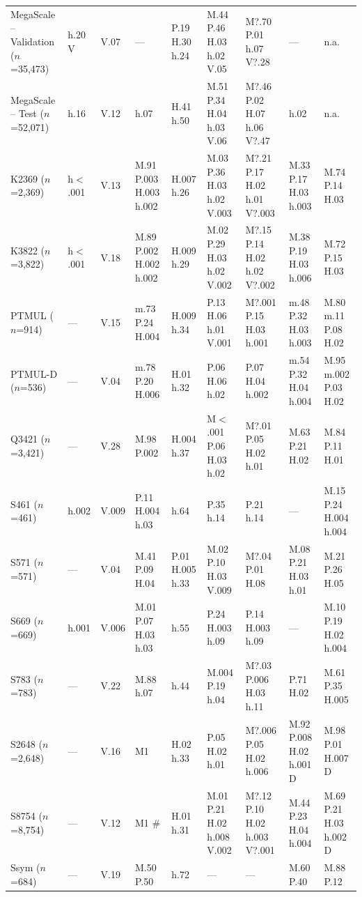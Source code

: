 \begin{table}[H]
{\begin{tabular}{@{}lllllllll}
        MegaScale -- Validation ($n$=35,473) & h.20 V & V.07 & --- & P.19 H.30 h.24 & M.44 P.46 H.03 h.02 V.05 & M?.70 P.01 h.07 V?.28 & --- & n.a. \\
        MegaScale -- Test ($n$=52,071) & h.16 & V.12 & h.07 & H.41 h.50 & M.51 P.34 H.04 h.03 V.06 & M?.46 P.02 H.07 h.06 V?.47 & h.02 & n.a. \\
        \midrule
        K2369 ($n$=2,369) & h$<$.001 & V.13 & M.91 P.003 H.003 h.002 & H.007 h.26 & M.03 P.36 H.03 h.02 V.003 & M?.21 P.17 H.02 h.01 V?.003 & M.33 P.17 H.03 h.003 & M.74 P.14 H.03 \\
        K3822 ($n$=3,822) & h$<$.001 & V.18 & M.89 P.002 H.002 h.002 & H.009 h.29 & M.02 P.29 H.03 h.02 V.002 & M?.15 P.14 H.02 h.02 V?.002 & M.38 P.19 H.03 h.006 & M.72 P.15 H.03 \\
        PTMUL ($n$=914) & --- & V.15 & m.73 P.24 H.004 & H.009 h.34 & P.13 H.06 h.01 V.001 & M?.001 P.15 H.03 h.001 & m.48 P.32 H.03 h.003 & M.80 m.11 P.08 H.02 \\
        PTMUL-D ($n$=536) & --- & V.04 & m.78 P.20 H.006 & H.01 h.32 & P.06 H.06 h.02 & P.07 H.04 h.002 & m.54 P.32 H.04 h.004 & M.95 m.002 P.03 H.02 \\
        Q3421 ($n$=3,421) & --- & V.28 & M.98 P.002 & H.004 h.37 & M$<$.001 P.06 H.03 h.02 & M?.01 P.05 H.02 h.01 & M.63 P.21 H.02 & M.84 P.11 H.01 \\
        S461 ($n$=461) & h.002 & V.009 & P.11 H.004 h.03 & h.64 & P.35 h.14 & P.21 h.14 & --- & M.15 P.24 H.004 h.004 \\
        S571 ($n$=571) & --- & V.04 & M.41 P.09 H.04 & P.01 H.005 h.33 & M.02 P.10 H.03 V.009 & M?.04 P.01 H.08 & M.08 P.21 H.03 h.01 & M.21 P.26 H.05 \\
        S669 ($n$=669) & h.001 & V.006 & M.01 P.07 H.03 h.03 & h.55 & P.24 H.003 h.09 & P.14 H.003 h.09 & --- & M.10 P.19 H.02 h.004 \\
        S783 ($n$=783) & --- & V.22 & M.88 h.07 & h.44 & M.004 P.19 h.04 & M?.03 P.006 H.03 h.11 & P.71 H.02 & M.61 P.35 H.005 \\
        S2648 ($n$=2,648) & --- & V.16 & M1 & H.02 h.33 & P.05 H.02 h.01 & M?.006 P.05 H.02 h.006 & M.92 P.008 H.02 h.001 D & M.98 P.01 H.007 D \\
        S8754 ($n$=8,754) & --- & V.12 & M1 \# & H.01 h.31 & M.01 P.21 H.02 h.008 V.002 & M?.12 P.10 H.02 h.003 V?.001 & M.44 P.23 H.04 h.004 & M.69 P.21 H.03 h.002 D \\
        Ssym ($n$=684) & --- & V.19 & M.50 P.50 & h.72 & --- & --- & M.60 P.40 & M.88 P.12 \\

\end{tabular}}
\end{table}
